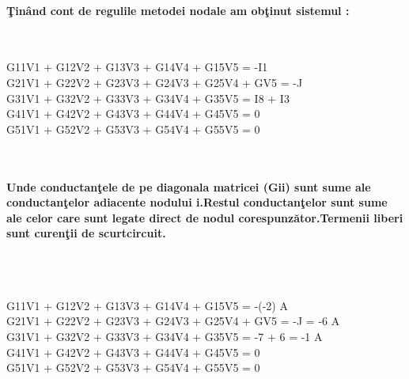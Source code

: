 \documentclass[12pt,twoside]{report}
\numberwithin{figure}{section}
\begin{document}
			\paragraph{\c{T}in\^{a}nd cont de regulile metodei nodale am ob\c{t}inut sistemul :}\\
			\hfill		
			
			\begin{cases}
			G\small{11}V\small{1} + G\small{12}V\small{2} + G\small{13}V\small{3} + G\small{14}V\small{4} + G\small{15}V\small{5} = -I\small{1} \\
			G\small{21}V\small{1} + G\small{22}V\small{2} + G\small{23}V\small{3} + G\small{24}V\small{3} + G\small{25}V\small{4} + G\small{}V\small{5} = -J \\
			G\small{31}V\small{1} + G\small{32}V\small{2} + G\small{33}V\small{3} + G\small{34}V\small{4} + G\small{35}V\small{5} = I\small{8} + I\small{3}\\
			G\small{41}V\small{1} + G\small{42}V\small{2} + G\small{43}V\small{3} + G\small{44}V\small{4} + G\small{45}V\small{5} = 0 \\
			G\small{51}V\small{1} + G\small{52}V\small{2} + G\small{53}V\small{3} + G\small{54}V\small{4} + G\small{55}V\small{5} = 0 \\
			
			\end{cases}	\\
			\hfill	
			
			\paragraph{Unde conductan\c{t}ele de pe diagonala matricei (G\small{ii}) sunt sume ale conductan\c{t}elor adiacente nodului i.Restul conductan\c{t}elor sunt sume ale celor care sunt legate direct de nodul corespunz\u{a}tor.Termenii liberi sunt curen\c{t}ii de scurtcircuit.}\\
			\\
			\hfill	
			\vspace{1cm}
			
			\begin{cases}
			G\small{11}V\small{1} + G\small{12}V\small{2} + G\small{13}V\small{3} + G\small{14}V\small{4} + G\small{15}V\small{5} = -(-2) A\\
			G\small{21}V\small{1} + G\small{22}V\small{2} + G\small{23}V\small{3} + G\small{24}V\small{3} + G\small{25}V\small{4} + G\small{}V\small{5} = -J = -6 A \\
			G\small{31}V\small{1} + G\small{32}V\small{2} + G\small{33}V\small{3} + G\small{34}V\small{4} + G\small{35}V\small{5} = -7 + 6 = -1 A\\
			G\small{41}V\small{1} + G\small{42}V\small{2} + G\small{43}V\small{3} + G\small{44}V\small{4} + G\small{45}V\small{5} = 0 \\
			G\small{51}V\small{1} + G\small{52}V\small{2} + G\small{53}V\small{3} + G\small{54}V\small{4} + G\small{55}V\small{5} = 0 \\
			
			\end{cases}
\end{document}
